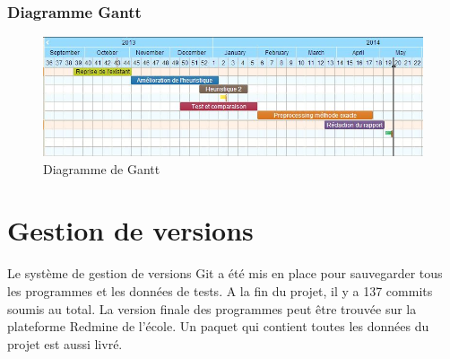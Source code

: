 \subsubsection{Diagramme Gantt}
\bigskip
\begin{figure}[!htbp]
	\centering
		\includegraphics{pics/gantt.jpg}
	\caption{Diagramme de Gantt}
	\label{fig:gantt}
\end{figure}
\bigskip

\section{Gestion de versions}
Le système de gestion de versions Git a été mis en place pour sauvegarder tous les programmes et les données de tests. A la fin du projet, il y a 137 commits soumis au total. La version finale des programmes peut être trouvée sur la plateforme Redmine de l'école. Un paquet qui contient toutes les données du projet est aussi livré.

